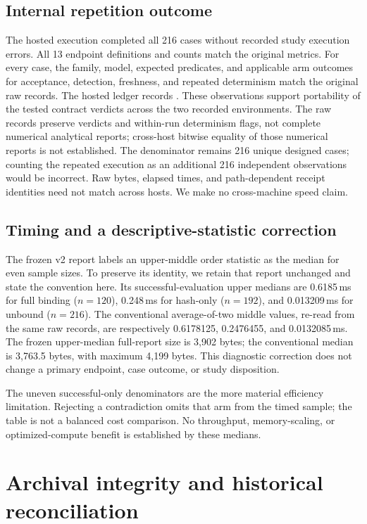 \documentclass[10pt]{article}
\newcommand{\code}[1]{\texttt{\detokenize{#1}}}
\begin{document}
\subsection{Internal repetition outcome}

The hosted execution completed all 216 cases without recorded study execution
errors. All 13 endpoint definitions and counts match the original metrics.
For every case, the family, model, expected predicates, and applicable arm
outcomes for acceptance, detection, freshness, and repeated determinism match
the original raw records. The hosted ledger records \code{EXECUTED_ONCE}.
These observations support portability of the tested contract verdicts across
the two recorded environments. The raw records preserve verdicts and
within-run determinism flags, not complete numerical analytical reports;
cross-host bitwise equality of those numerical reports is not established.
The denominator remains 216 unique designed cases; counting the repeated
execution as an additional 216 independent observations would be incorrect.
Raw bytes, elapsed times, and path-dependent receipt identities need not
match across hosts. We make no cross-machine speed claim.

\subsection{Timing and a descriptive-statistic correction}

The frozen v2 report labels an upper-middle order statistic as the median for
even sample sizes. To preserve its identity, we retain that report unchanged
and state the convention here. Its successful-evaluation upper medians are
0.6185\,ms for full binding (\(n=120\)), 0.248\,ms for hash-only (\(n=192\)),
and 0.013209\,ms for unbound (\(n=216\)). The conventional average-of-two
middle values, re-read from the same raw records, are respectively
0.6178125, 0.2476455, and 0.0132085\,ms. The frozen upper-median full-report
size is 3,902 bytes; the conventional median is 3,763.5 bytes, with maximum
4,199 bytes. This diagnostic correction does not change a primary endpoint,
case outcome, or study disposition.

The uneven successful-only denominators are the more material efficiency
limitation. Rejecting a contradiction omits that arm from the timed sample;
the table is not a balanced cost comparison. No throughput, memory-scaling,
or optimized-compute benefit is established by these medians.

\section{Archival integrity and historical reconciliation}
\end{document}

